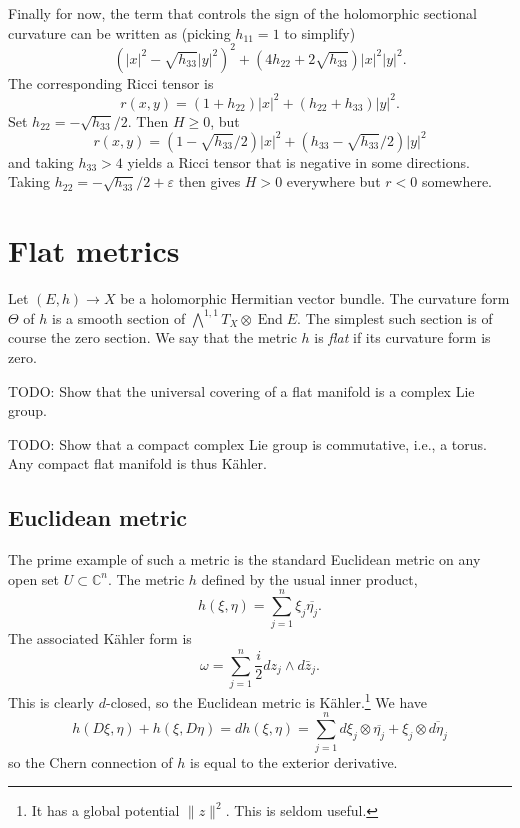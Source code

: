 \documentclass[11pt]{article}
\theoremstyle{definition}
\newcommand{\kk}[1]{\mathbb{#1}}
\DeclareMathOperator{\End}{End}
\begin{document}
Finally for now, the term that controls the sign of the holomorphic sectional curvature can be written as (picking $h_{11} = 1$ to simplify)
$$
(|x|^2 - \sqrt{h_{33}}|y|^2)^2 + (4h_{22} + 2\sqrt{h_{33}})|x|^2|y|^2.
$$
The corresponding Ricci tensor is
$$
r(x,y) = (1 + h_{22})|x|^2 + (h_{22} + h_{33}) |y|^2.
$$
Set $h_{22} = -\sqrt{h_{33}}/2$. Then $H \geq 0$, but
$$
r(x,y) = (1-\sqrt{h_{33}}/2)|x|^2 + (h_{33} - \sqrt{h_{33}}/2)|y|^2
$$
and taking $h_{33} > 4$ yields a Ricci tensor that is negative in some directions. Taking $h_{22} = -\sqrt{h_{33}}/2 + \varepsilon$ then gives $H > 0$ everywhere but $r < 0$ somewhere.


\section{Flat metrics}
\label{sec:org504b250}

Let $(E,h) \to X$ be a holomorphic Hermitian vector bundle. The curvature form $\Theta$ of $h$ is a smooth section of $\bigwedge^{1,1}T_X \otimes \End E$. The simplest such section is of course the zero section. We say that the metric $h$ is \emph{flat} if its curvature form is zero.


TODO: Show that the universal covering of a flat manifold is a complex Lie group.

TODO: Show that a compact complex Lie group is commutative, i.e., a torus. Any compact flat manifold is thus K\"ahler.


\subsection{Euclidean metric}

The prime example of such a metric is the standard Euclidean metric on any open set $U \subset \kk C^n$. The metric $h$ defined by the usual inner product,
$$
h(\xi, \eta) = \sum_{j=1}^n \xi_j \overline{\eta_j}.
$$
The associated K\"ahler form is
$$
\omega = \sum_{j=1}^n \frac{i}{2} dz_j \wedge d\bar z_j.
$$
This is clearly $d$-closed, so the Euclidean metric is K\"ahler.\footnote{It has a global potential $\|z\|^2$. This is seldom useful.} We have
$$
h(D\xi, \eta) + h(\xi, D\eta)
= d h(\xi, \eta)
= \sum_{j=1}^n d\xi_j \otimes \overline{\eta_j} + \xi_j \otimes \overline{d\eta_j}
$$
so the Chern connection of $h$ is equal to the exterior derivative.

\end{document}
